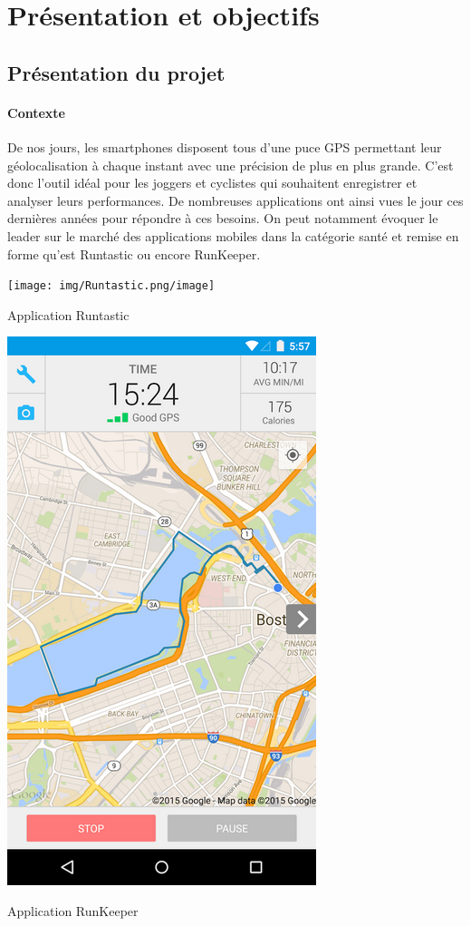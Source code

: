 \part{Présentation et objectifs}
\chapter{Présentation du projet}
\subsection{Contexte}
De nos jours, les smartphones disposent tous d'une puce GPS permettant leur géolocalisation à chaque instant avec une précision de plus en plus grande. C'est donc l'outil idéal pour les joggers et cyclistes qui souhaitent enregistrer et analyser leurs performances. De nombreuses applications ont ainsi vues le jour ces dernières années pour répondre à ces besoins. On peut notamment évoquer le leader sur le marché des applications mobiles dans la catégorie santé et remise en forme qu'est Runtastic ou encore RunKeeper.\\

\begin{img}
  \texttt{[image: img/Runtastic.png/image]}
  \caption{Application Runtastic}
\end{img}

\begin{img}
  \includegraphics{img/Runkeeper.png}
  \caption{Application RunKeeper}
\end{img}

